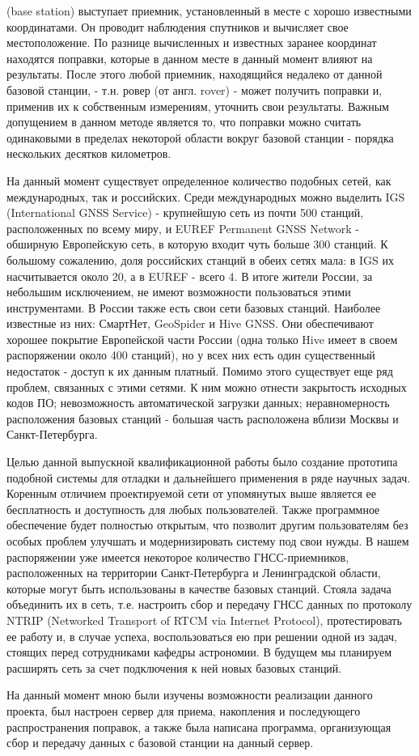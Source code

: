 \documentclass[a4paper,12pt]{report}
\begin{document}
(base station) выступает приемник, установленный в месте с хорошо известными координатами. Он проводит наблюдения спутников и 
вычисляет свое местоположение. По разнице вычисленных и известных заранее координат находятся поправки, которые в данном месте в данный 
момент влияют на результаты. После этого любой приемник, находящийся недалеко от данной базовой станции, - т.н. ровер (от англ. rover) - 
может получить поправки и, применив их к собственным измерениям, уточнить свои результаты. Важным допущением в данном методе является то, 
что поправки можно считать одинаковыми в пределах некоторой области вокруг базовой станции - порядка нескольких десятков километров. \par
На данный момент существует определенное количество подобных сетей, как международных, так и российских. Среди международных можно 
выделить IGS (International GNSS Service) - крупнейшую сеть из почти 500 станций, расположенных по всему миру, и EUREF Permanent GNSS 
Network - обширную Европейскую сеть, в которую входит чуть больше 300 станций. К большому сожалению, доля российских станций в обеих 
сетях мала: в IGS их насчитывается около 20, а в EUREF - всего 4. В итоге жители России, за небольшим исключением, не имеют возможности 
пользоваться этими инструментами. В России также есть свои сети базовых станций. Наиболее известные из них: СмартНет, GeoSpider и Hive GNSS.
Они обеспечивают хорошее покрытие Европейской части России (одна только Hive имеет в своем распоряжении около 400 станций), но у всех 
них есть один существенный недостаток - доступ к их данным платный. Помимо этого существует еще ряд проблем, связанных с этими сетями. 
К ним можно отнести закрытость исходных кодов ПО; невозможность автоматической загрузки данных; неравномерность расположения базовых 
станций - большая часть расположена вблизи Москвы и Санкт-Петербурга. \par
Целью данной выпускной квалификационной работы было создание прототипа подобной системы для отладки и дальнейшего применения в ряде
научных задач. Коренным отличием проектируемой сети от упомянутых выше является ее бесплатность и доступность для любых пользователей. 
Также программное обеспечение будет полностью открытым, что позволит другим пользователям без особых проблем улучшать и модернизировать 
систему под свои нужды.
В нашем распоряжении уже имеется некоторое количество ГНСС-приемников, расположенных на территории Санкт-Петербурга и Ленинградской
области, которые могут быть использованы в качестве базовых станций. Стояла задача объединить их в сеть, т.е. настроить сбор и передачу 
ГНСС данных по протоколу NTRIP (Networked Transport of RTCM via Internet Protocol), протестировать ее работу и, в случае успеха, 
воспользоваться ею при решении одной из задач, стоящих перед сотрудниками кафедры астрономии. В будущем мы планируем расширять сеть 
за счет подключения к ней новых базовых станций. \par
На данный момент мною были изучены возможности реализации данного проекта, был настроен сервер 
для приема, накопления и последующего распространения поправок, а также была написана программа, организующая сбор и передачу данных с 
базовой станции на данный сервер.
\newpage
\end{document}
